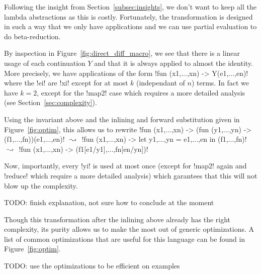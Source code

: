 Following the insight from Section~\ref{subsec:insights}, 
we don't want to keep all the lambda abstractions as this is costly. 
Fortunately, the transformation is designed in such a way that we only have applications 
and we can use partial evaluation to do beta-reduction. 

By inspection in Figure~\ref{fig:direct_diff_macro}, 
we see that there is a linear usage of  each continuation $Y$ 
and that it is always applied to almost the identity. 
More precisely, we have applications of the form !fun (x1,...,xn) -> Y(e1,...,en)! 
where the !ei! are !xi! except for at most $k$ (independant of $n$) terms.
In fact we have $k=2$, except for the !map2! case which requires a more detailed analysis (see Section~\ref{sec:complexity}).

Using the invariant above and the inlining and forward substitution given in Figure~\ref{fig:optim}, this allows us to rewrite
!fun (x1,...,xn) -> (fun (y1,...,yn) -> (f1,...,fn))(e1,...,en)! 
$\text{ $\leadsto$ }$ 
!fun (x1,...,xn) -> let y1,...,yn = e1,...,en in (f1,...,fn)!
$\text{ $\leadsto$ }$
!fun (x1,...,xn) -> (f1[e1/y1],...,fn[en/yn])!

Now, importantly, every !yi! is used at most once (except for !map2! again and !reduce! which require a more detailed analysis)
which garantees that this will not blow up the complexity.

TODO: finish explanation, not sure how to conclude at the moment

Though this transformation after the inlining above already has the right complexity, 
its purity allows us to make the most out of generic optimizations.  
A list of common optimizations that are useful for this language can be found in Figure~\ref{fig:optim}.

TODO: use the optimizations to be efficient on examples